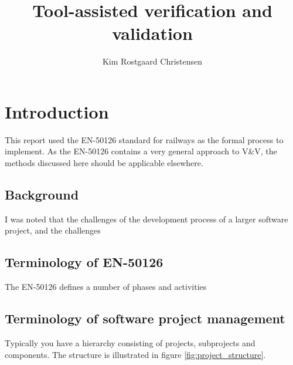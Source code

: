 \documentclass[10pt,a4paper]{article}
\author{Kim Rostgaard Christensen}
\title{Tool-assisted verification and validation}
\begin{document}
\maketitle


\tableofcontents
\newpage

\section{Introduction}
This report used the EN-50126 standard for railways as the formal process to implement. As the EN-50126 contains a very general approach to V\&V, the methods discussed here should be applicable elsewhere.

\subsection{Background}
I was noted that the challenges of the development process of a larger software project, and the challenges


\subsection{Terminology of EN-50126}
The EN-50126 defines a number of phases and activities

\subsection{Terminology of software project management}
Typically you have a hierarchy consisting of projects, subprojects and components. The structure is illustrated in figure \ref{fig:project_structure}.
\end{document}

